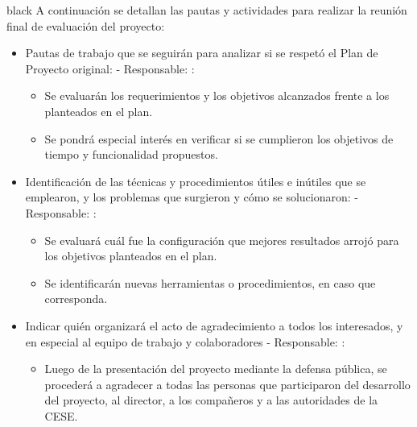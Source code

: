 \documentclass[
11pt, %
]{charter}
\begin{document}
\begin{consigna}{black}
A continuación se detallan las pautas y actividades para realizar la reunión final de evaluación del proyecto:

\begin{itemize}
	\item Pautas de trabajo que se seguirán para analizar si se respetó el Plan de Proyecto original:
	 - Responsable: \authorname:
	\begin{itemize}			
		\item Se evaluarán los requerimientos y los objetivos alcanzados frente a los planteados en el plan.
		\item Se pondrá especial interés en verificar si se cumplieron los objetivos de tiempo y funcionalidad propuestos.
	\end{itemize}	    	 
	
	\item Identificación de las técnicas y procedimientos útiles e inútiles que se emplearon, y los problemas que surgieron y cómo se solucionaron:
	 - Responsable: \authorname:
	\begin{itemize}			
		\item Se evaluará cuál fue la configuración que mejores resultados arrojó para los objetivos planteados en el plan.
		\item Se identificarán nuevas herramientas o procedimientos, en caso que corresponda.
	\end{itemize}	    	 
	
	\item Indicar quién organizará el acto de agradecimiento a todos los interesados, y en especial al equipo de trabajo y colaboradores - Responsable: \authorname :
	\begin{itemize}			
		\item Luego de la presentación del proyecto mediante la defensa pública, se procederá a agradecer a todas las personas que participaron del desarrollo del proyecto, al director, a los compañeros y a las autoridades de la CESE.
	\end{itemize}	 
	
	    	 
	 
\end{itemize}

\end{consigna}
\end{document}
